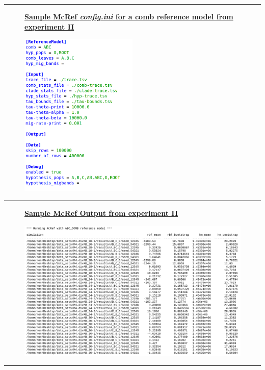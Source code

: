 \documentclass[11pt]{article}
\newcommand{\1}{\mathbbm{1}}
\newcommand{\figuretitle}[1]{
	\centering
	\underline{\textbf{#1}}
	\par
	\medskip
}
\begin{document}
\noindent\rule{16cm}{0.4pt}

\begin{figure}[H]
\figuretitle{Sample McRef \textit{config.ini} for a comb reference model from experiment II}
\includegraphics[width=0.5\textwidth]{appendix/sample_McRef_configuration}
\label{fig:sample_McRef_output}
\end{figure}

\noindent\rule{16cm}{0.4pt}

\begin{figure}[H]
\figuretitle{Sample McRef Output from experiment II}
\includegraphics[width=1.0\textwidth]{appendix/sample_McRef_output}
\label{fig:sample_McRef_output}
\end{figure}

\noindent\rule{16cm}{0.4pt}
\end{document}
